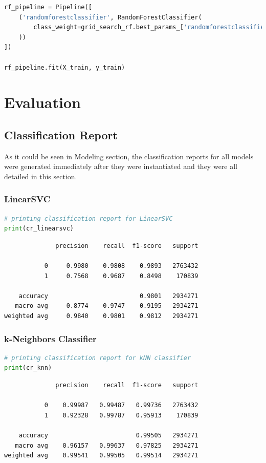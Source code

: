 \documentclass{article}
\begin{document}
\begin{lstlisting}[language=Python]
rf_pipeline = Pipeline([
    ('randomforestclassifier', RandomForestClassifier(
        class_weight=grid_search_rf.best_params_['randomforestclassifier__class_weight']
    ))
])

rf_pipeline.fit(X_train, y_train)
\end{lstlisting}

\section{Evaluation}

\subsection{Classification Report}

As it could be seen in Modeling section, the classification reports for all models were generated immediately after they were instantiated and they were all detailed in this section.

\subsubsection{LinearSVC}
\begin{lstlisting}[language=Python]
# printing classification report for LinearSVC
print(cr_linearsvc)
\end{lstlisting}
\begin{verbatim}  
              precision    recall  f1-score   support

           0     0.9980    0.9808    0.9893   2763432
           1     0.7568    0.9687    0.8498    170839

    accuracy                         0.9801   2934271
   macro avg     0.8774    0.9747    0.9195   2934271
weighted avg     0.9840    0.9801    0.9812   2934271
\end{verbatim}

\subsubsection{k-Neighbors Classifier}
\begin{lstlisting}[language=Python]
# printing classification report for kNN classifier
print(cr_knn)
\end{lstlisting}
\begin{verbatim}  
              precision    recall  f1-score   support

           0    0.99987   0.99487   0.99736   2763432
           1    0.92328   0.99787   0.95913    170839

    accuracy                        0.99505   2934271
   macro avg    0.96157   0.99637   0.97825   2934271
weighted avg    0.99541   0.99505   0.99514   2934271
\end{verbatim}
\end{document}
